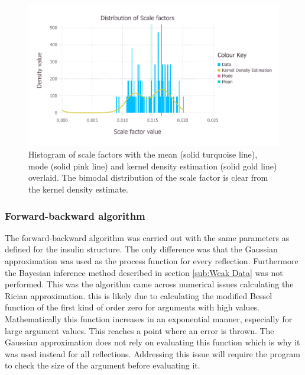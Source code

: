 \begin{figure}[ht!]
    \centering
    \includegraphics[width=1.0\textwidth]{figures/datared/ScaleFac_Distribution_cprot.pdf}
    \caption{Histogram of scale factors with the mean (solid turquoise line), mode (solid pink line) and kernel density estimation (solid gold line) overlaid.
    The bimodal distribution of the scale factor is clear from the kernel density estimate.}
    \label{fig:Scale factor distribution after outlier removal - C.Esp1396I}
\end{figure}

\subsubsection{Forward-backward algorithm}
\label{subs:Forward-backward algorithm - C.Esp1396I}
The forward-backward algorithm was carried out with the same parameters as defined for the insulin structure.
The only difference was that the Gaussian approximation was used as the process function for every reflection.
Furthermore the Bayesian inference method described in section \ref{sub:Weak Data} was not performed.
This was the algorithm came across numerical issues calculating the Rician approximation.
this is likely due to calculating the modified Bessel function of the first kind of order zero for arguments with high values.
Mathematically this function increases in an exponential manner, especially for large argument values.
This reaches a point where an error is thrown.
The Gaussian approximation does not rely on evaluating this function which is why it was used instead for all reflections.
Addressing this issue will require the program to check the size of the argument before evaluating it.

